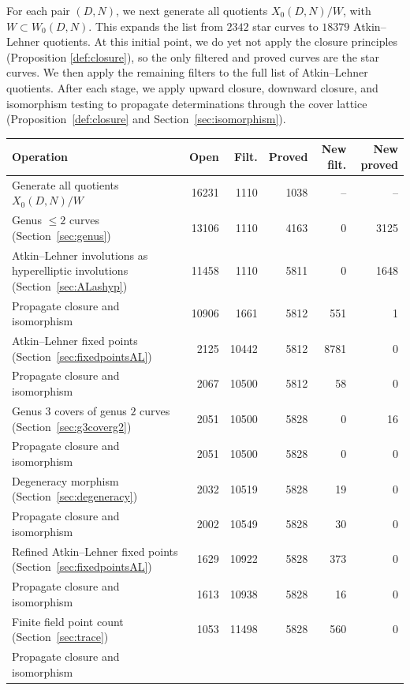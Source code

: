 \documentclass[12pt]{amsart}
\numberwithin{equation}{subsection}
\theoremstyle{plain}\newtheorem{ithm}{Theorem}
\theoremstyle{plain}\newtheorem{iprop}[ithm]{Proposition}
\theoremstyle{definition}
\theoremstyle{remark}
\newcommand{\Curve}[2]{X_0({#1},{#2})} %
\newcommand{\ALfull}[2]{W_0({#1},{#2})} %
\begin{document}
For each pair $(D,N)$, we next generate all quotients $\Curve{D}{N}/W$, with $W\subset \ALfull{D}{N}$.
This expands the list from $2342$ star curves to $18379$ Atkin--Lehner quotients. At this initial point, we do yet not apply the closure principles (Proposition \ref{def:closure}), so the only filtered and proved curves are the star curves.
We then apply the remaining filters to the full list of Atkin--Lehner quotients. After each stage, we apply upward closure, downward closure, and isomorphism testing to propagate determinations through the cover lattice (Proposition~\ref{def:closure} and Section~\ref{sec:isomorphism}). 
\begin{table}[ht]
\centering \small 
 \renewcommand{\arraystretch}{1.15}
  \setlength{\tabcolsep}{3pt}
\begin{tabularx}{\textwidth}{Xrrrrr}
\toprule
Operation & Open & Filt. & Proved & New filt. & New proved \\
\midrule
Generate all quotients $\Curve{D}{N}/W$
& 16231 & 1110 & 1038 & -- & -- \\
Genus $\leq 2$ curves (Section~\ref{sec:genus})
& 13106 & 1110 & 4163 & 0 & 3125 \\
Atkin--Lehner involutions as hyperelliptic involutions (Section~\ref{sec:ALashyp})
& 11458 & 1110 & 5811 & 0 & 1648 \\
Propagate closure and isomorphism
& 10906 & 1661 & 5812 & 551 & 1 \\
Atkin--Lehner fixed points (Section~\ref{sec:fixedpointsAL})
& 2125 & 10442 & 5812 & 8781 & 0 \\
Propagate closure and isomorphism
& 2067 & 10500 & 5812 & 58 & 0 \\
Genus $3$ covers of genus $2$ curves (Section~\ref{sec:g3coverg2})
& 2051 & 10500 & 5828 & 0 & 16 \\
Propagate closure and isomorphism
& 2051 & 10500 & 5828 & 0 & 0 \\
Degeneracy morphism (Section~\ref{sec:degeneracy})
& 2032 & 10519 & 5828 & 19 & 0 \\
Propagate closure and isomorphism
& 2002 & 10549 & 5828 & 30 & 0 \\
Refined Atkin--Lehner fixed points (Section~\ref{sec:fixedpointsAL})
& 1629 & 10922 & 5828 & 373 & 0 \\
Propagate closure and isomorphism
& 1613 & 10938 & 5828 & 16 & 0 \\
Finite field point count (Section~\ref{sec:trace})
& 1053 & 11498 & 5828 & 560 & 0 \\
Propagate closure and isomorphism

\end{tabularx}
\end{table}
\end{document}

